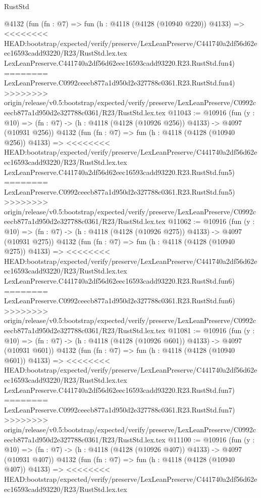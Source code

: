 \begin{lexlean}{RustStd}
\begin{coremodule}
{\begin{coremodule}
{{{{{{{{{{{{{{    @4132
    (fun (fn : @7) =>
    fun (h : @4118 (@4128 (@10940 @220)) @4133) =>
<<<<<<<< HEAD:bootstrap/expected/verify/preserve/LexLeanPreserve/C441740a2df56d62eec16593cadd93220/R23/RustStd.lex.tex
    LexLeanPreserve.C441740a2df56d62eec16593cadd93220.R23.RustStd.fun4)
========
    LexLeanPreserve.C0992ceecb877a1d950d2e327788c0361.R23.RustStd.fun4)
>>>>>>>> origin/release/v0.5:bootstrap/expected/verify/preserve/LexLeanPreserve/C0992ceecb877a1d950d2e327788c0361/R23/RustStd.lex.tex
@11043 := @10916
    (fun (y : @10) => (fn : @7) -> (h : @4118 (@4128 (@10926 @256)) @4133) -> @4097 (@10931 @256))
    @4132
    (fun (fn : @7) =>
    fun (h : @4118 (@4128 (@10940 @256)) @4133) =>
<<<<<<<< HEAD:bootstrap/expected/verify/preserve/LexLeanPreserve/C441740a2df56d62eec16593cadd93220/R23/RustStd.lex.tex
    LexLeanPreserve.C441740a2df56d62eec16593cadd93220.R23.RustStd.fun5)
========
    LexLeanPreserve.C0992ceecb877a1d950d2e327788c0361.R23.RustStd.fun5)
>>>>>>>> origin/release/v0.5:bootstrap/expected/verify/preserve/LexLeanPreserve/C0992ceecb877a1d950d2e327788c0361/R23/RustStd.lex.tex
@11062 := @10916
    (fun (y : @10) => (fn : @7) -> (h : @4118 (@4128 (@10926 @275)) @4133) -> @4097 (@10931 @275))
    @4132
    (fun (fn : @7) =>
    fun (h : @4118 (@4128 (@10940 @275)) @4133) =>
<<<<<<<< HEAD:bootstrap/expected/verify/preserve/LexLeanPreserve/C441740a2df56d62eec16593cadd93220/R23/RustStd.lex.tex
    LexLeanPreserve.C441740a2df56d62eec16593cadd93220.R23.RustStd.fun6)
========
    LexLeanPreserve.C0992ceecb877a1d950d2e327788c0361.R23.RustStd.fun6)
>>>>>>>> origin/release/v0.5:bootstrap/expected/verify/preserve/LexLeanPreserve/C0992ceecb877a1d950d2e327788c0361/R23/RustStd.lex.tex
@11081 := @10916
    (fun (y : @10) => (fn : @7) -> (h : @4118 (@4128 (@10926 @601)) @4133) -> @4097 (@10931 @601))
    @4132
    (fun (fn : @7) =>
    fun (h : @4118 (@4128 (@10940 @601)) @4133) =>
<<<<<<<< HEAD:bootstrap/expected/verify/preserve/LexLeanPreserve/C441740a2df56d62eec16593cadd93220/R23/RustStd.lex.tex
    LexLeanPreserve.C441740a2df56d62eec16593cadd93220.R23.RustStd.fun7)
========
    LexLeanPreserve.C0992ceecb877a1d950d2e327788c0361.R23.RustStd.fun7)
>>>>>>>> origin/release/v0.5:bootstrap/expected/verify/preserve/LexLeanPreserve/C0992ceecb877a1d950d2e327788c0361/R23/RustStd.lex.tex
@11100 := @10916
    (fun (y : @10) => (fn : @7) -> (h : @4118 (@4128 (@10926 @407)) @4133) -> @4097 (@10931 @407))
    @4132
    (fun (fn : @7) =>
    fun (h : @4118 (@4128 (@10940 @407)) @4133) =>
<<<<<<<< HEAD:bootstrap/expected/verify/preserve/LexLeanPreserve/C441740a2df56d62eec16593cadd93220/R23/RustStd.lex.tex
}}}}}}}}}}}}}}
\end{coremodule}}
\end{coremodule}
\end{lexlean}
